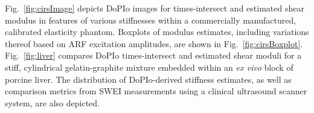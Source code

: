 %

Fig.~\ref{fig:cirsImage} depicts DoPIo images for times-intersect and estimated shear modulus in features of various stiffnesses within a commercially manufactured, calibrated elasticity phantom. Boxplots of modulus estimates, including variations thereof based on ARF excitation amplitudes, are shown in Fig.~\ref{fig:cirsBoxplot}. Fig.~\ref{fig:liver} compares DoPIo times-intersect and estimated shear moduli for a stiff, cylindrical gelatin-graphite mixture embedded within an \emph{ex vivo} block of porcine liver. The distribution of DoPIo-derived stiffness estimates, as well as comparison metrics from SWEI measurements using a clinical ultrasound scanner system, are also depicted. 

%

